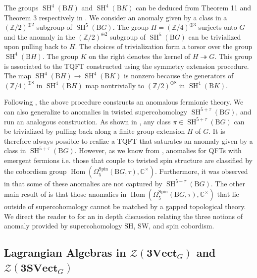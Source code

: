 \documentclass[11pt,reqno]{amsart}
\DeclareMathOperator{\Hom}{Hom}
\newcommand{\Z}{\mathbb{Z}}
\DeclareMathOperator{\SH}{SH}
\newcommand{\cZ}{\mathcal{Z}}
\newcommand{\rB}{\mathrm{B}}
\numberwithin{equation}{section}
\theoremstyle{plain}
\theoremstyle{definition}
\begin{document}
\noindent 
The groups $\SH^4(\rB H)$ and $\SH^4(\rB K)$ can be deduced from Theorem 11 and Theorem 3 respectively in \cite{Guo:2018vij}.
We consider an anomaly given by a class in a $(\Z/2)^{\oplus 2}$ subgroup of $\SH^{5}(\rB G)$.
The group $H=(\Z/4)^{\oplus 3}$ surjects onto $G$ and the  anomaly in the $(\Z/2)^{\oplus 2}$ subgroup of $\SH^{5}(\rB G)$ can be trivialized upon pulling back to $H$.
The choices of trivialization form a torsor over the group $\SH^{4}(\rB H)$.
The group $K$ on the right denotes the kernel of $H\twoheadrightarrow G$.
This group is associated to the TQFT constructed using the symmetry extension procedure. The map $\SH^{4}(\rB H)\rightarrow \SH^{4}(\rB K)$ is nonzero because the generators of $(\Z/4)^{\oplus 8}$ in $\SH^4(\rB H)$ map nontrivially to $(\Z/2)^{\oplus 8}$ in $\SH^{4}(\rB K)$. 

Following , the above procedure constructs an anomalous fermionic theory. 
We can also generalize  to anomalies in twisted supercohomology $\SH^{5+\tau}(\rB G)$, and run an analogous construction.
As shown in \cite[Theorem 3.2]{DYY1}, any class $\pi \in \SH^{5+\tau}(\rB G)$ can be trivialized by pulling back along a finite group extension $H$ of $G$.
It is therefore always possible to realize a TQFT that saturates an anomaly given by a class in $\SH^{5+\tau}(\rB G)$. However, as we know from \cite{Freed:2016rqq}, anomalies for QFTs with emergent fermions i.e. those that couple to twisted spin structure  are classified by the cobordism group $\Hom(\Omega^{\mathrm{Spin}}_5(\rB G,\tau),\mathbb{C}^\times)$. Furthermore, it was observed in \cite[Table III]{Debray:2026sqw} that some of these anomalies are not captured by $\SH^{5+\tau}(\rB G)$.
The other main result of  \cite[Theorem 3.1]{DYY1} is that those anomalies in $\Hom(\Omega^{\mathrm{Spin}}_5(\rB G,\tau),\mathbb{C}^\times)$ that lie outside of supercohomology cannot be matched by a gapped topological theory. We direct the reader to \cite[Appendix A]{DYY1} for an in depth discussion relating the three notions of anomaly provided by supercohomology $\mathrm{SH}$, $\mathrm{SW}$, and spin cobordism.


\subsection{Lagrangian Algebras in $\cZ(\mathbf{3Vect}_G)$ and $\cZ(\mathbf{3SVect}_G)$}\label{subsection:lagrangianalg}
\end{document}

